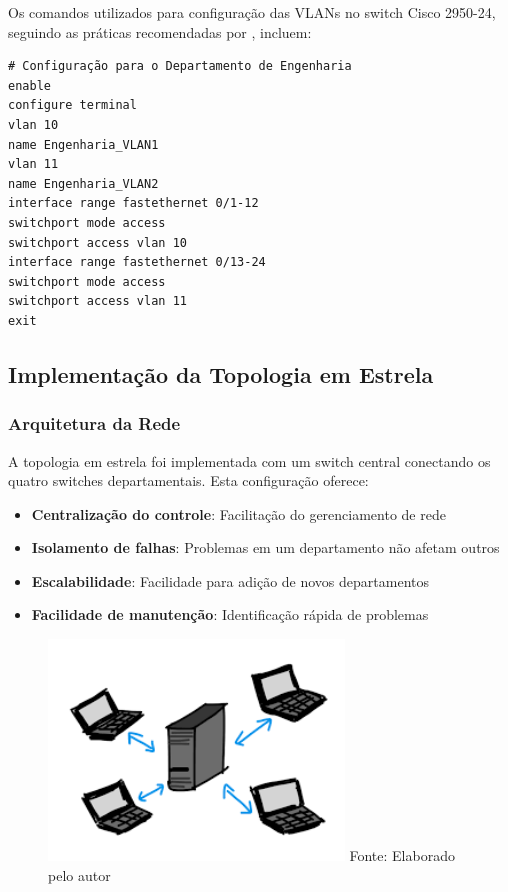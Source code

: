 Os comandos utilizados para configuração das VLANs no switch Cisco 2950-24, seguindo as práticas recomendadas por , incluem:

\begin{verbatim}
# Configuração para o Departamento de Engenharia
enable
configure terminal
vlan 10
name Engenharia_VLAN1
vlan 11
name Engenharia_VLAN2
interface range fastethernet 0/1-12
switchport mode access
switchport access vlan 10
interface range fastethernet 0/13-24
switchport mode access
switchport access vlan 11
exit
\end{verbatim}

\subsection{Implementação da Topologia em Estrela}

\subsubsection{Arquitetura da Rede}

A topologia em estrela foi implementada com um switch central conectando os quatro switches departamentais. Esta configuração oferece:

\begin{itemize}
    \item \textbf{Centralização do controle}: Facilitação do gerenciamento de rede
    \item \textbf{Isolamento de falhas}: Problemas em um departamento não afetam outros
    \item \textbf{Escalabilidade}: Facilidade para adição de novos departamentos
    \item \textbf{Facilidade de manutenção}: Identificação rápida de problemas
\end{itemize}

\begin{figure}[H]
\centering
{}
\includegraphics[width=0.7\textwidth]{figure/cliente-server.png}
\label{fig:cliente_servidor}
{\fontsize{10pt}{\baselineskip}\selectfont
Fonte: Elaborado pelo autor}
\end{figure}

